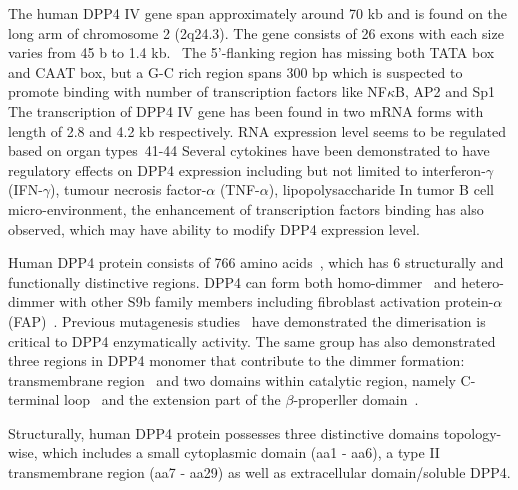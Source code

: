 The human DPP4 IV gene span approximately around 70 kb and is found on the long arm of chromosome 2 (2q24.3). The gene consists of 26 exons with each size varies from 45 b to 1.4 kb.~\cite{Abbott1994} The 5'-flanking region has missing both TATA box and CAAT box, but a G-C rich region spans 300 bp which is suspected to promote binding with number of transcription factors like NF$\kappa$B, AP2 and Sp1~\cite{Abbott1994,Böhm1995} The transcription of DPP4 IV gene has been found in two mRNA forms with length of 2.8 and 4.2 kb respectively. RNA expression level seems to be regulated based on organ types~41-44
Several cytokines have been demonstrated to have regulatory effects on DPP4 expression including but not limited to interferon-$\gamma$(IFN-$\gamma$), tumour necrosis factor-$\alpha$ (TNF-$\alpha$), lipopolysaccharide \cite{Erickson1999}
In tumor B cell micro-environment, the enhancement of transcription factors binding has also observed, which may have ability to modify DPP4 expression level.~\cite{Bauvois2000}
\par
Human DPP4 protein consists of 766 amino acids~\cite{Bär2003,Misumi1992}, which has 6 structurally and functionally distinctive regions. DPP4 can form both homo-dimmer~\cite{Rasmussen2003,Oefner2003,Thoma2003} and hetero-dimmer with other S9b family members including fibroblast activation protein-$\alpha$ (FAP)~\cite{Ghersi2006}. Previous mutagenesis studies~\cite{Chien_2004,Chien_2006} have demonstrated the dimerisation is critical to DPP4 enzymatically activity. The same group has also demonstrated three regions in DPP4 monomer that contribute to the dimmer formation: transmembrane region~\cite{Chung_2010} and two domains within catalytic region, namely C-terminal loop~\cite{Chien_2004} and the extension part of the $\beta$-properller domain~\cite{Chien_2006}.  
\par 
Structurally, human DPP4 protein possesses three distinctive domains topology-wise, which includes a small cytoplasmic domain (aa1 - aa6), a type II transmembrane region (aa7 - aa29) as well as extracellular domain/soluble DPP4. 
\par